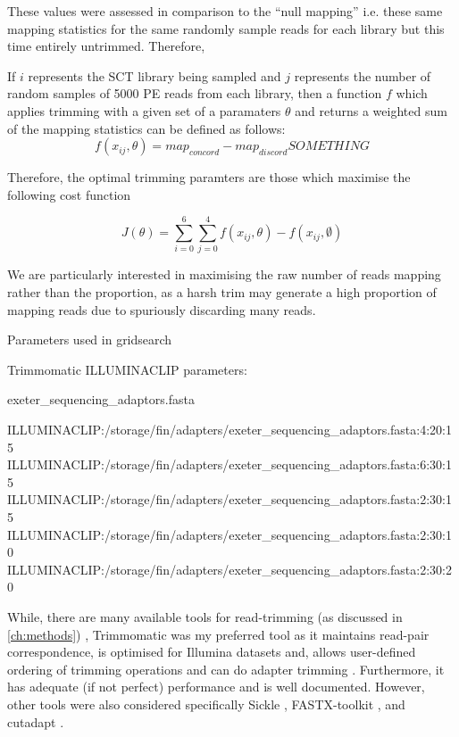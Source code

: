 These values were assessed in comparison to the ``null mapping'' i.e. these same mapping statistics for the same
randomly sample reads for each library but this time entirely untrimmed.  
Therefore, 


If \(i\) represents the SCT library being sampled and \(j\) represents the number of random samples of
5000 PE reads from each library, then a function \(f\) which applies trimming with a given set of a 
paramaters \(\theta\) and returns a weighted sum of the mapping statistics can be defined as follows:
\[
    f(x_{ij}, \theta) = map_{concord} - map_{discord}

    SOMETHING

\]

Therefore, the optimal trimming paramters \theta are those which maximise the following cost function

\[
    J(\theta) = \sum^{6}_{i=0} \sum^{4}_{j=0} f(x_{ij}, \theta) - f(x_{ij}, \emptyset)
\]



We are particularly interested in maximising the raw number of reads mapping rather than
the proportion, as a harsh trim may generate a high proportion of mapping reads due to spuriously discarding 
many reads.  




Parameters used in gridsearch

Trimmomatic ILLUMINACLIP parameters: 

exeter_sequencing_adaptors.fasta

ILLUMINACLIP:/storage/fin/adapters/exeter_sequencing_adaptors.fasta:4:20:15
ILLUMINACLIP:/storage/fin/adapters/exeter_sequencing_adaptors.fasta:6:30:15
ILLUMINACLIP:/storage/fin/adapters/exeter_sequencing_adaptors.fasta:2:30:15
ILLUMINACLIP:/storage/fin/adapters/exeter_sequencing_adaptors.fasta:2:30:10
ILLUMINACLIP:/storage/fin/adapters/exeter_sequencing_adaptors.fasta:2:30:20






While, there are many available tools for read-trimming (as discussed in \ref{ch:methods}) , 
Trimmomatic was my preferred tool as it maintains read-pair correspondence, is optimised for Illumina datasets and, allows user-defined ordering of trimming operations and can do adapter trimming \citep{Bolger2014a}.  
Furthermore, it has adequate (if not perfect) performance and is well documented.
However, other tools were also considered specifically Sickle \citep{JoshiGitHub}, FASTX-toolkit \citep{gordon2010fastx}, 
and cutadapt \citep{martin2011cutadapt}.

